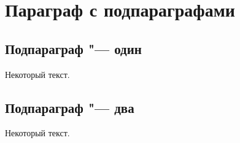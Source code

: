 \section{Параграф с подпараграфами} \label{sect3_3}

\subsection{Подпараграф "--- один} \label{subsect3_3_1}

Некоторый текст.

\subsection{Подпараграф "--- два} \label{subsect3_3_2}

Некоторый текст.

\clearpage